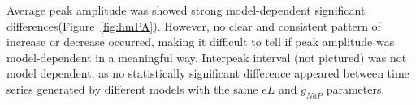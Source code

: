 \documentclass[11pt]{article}
\begin{document}
Average peak amplitude was showed strong model-dependent significant differences(Figure~\ref{fig:hmPA}). However, no clear and consistent pattern of increase or decrease occurred, making it difficult to tell if peak amplitude was model-dependent in a meaningful way. Interpeak interval (not pictured) was not model dependent, as no statistically significant difference appeared between time series generated by different models with the same $eL$ and $g_{NaP}$ parameters.


\begin{figure}[h]
\centering
	\caption{}
	\label{fig:hmPeakInBurst}
\end{figure}
\end{document}
